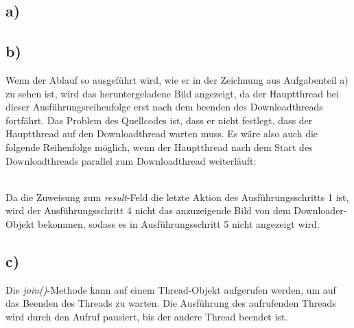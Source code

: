 \documentclass[ngerman]{fbi-aufgabenblatt}
\begin{document}
\subsection*{a)}
\subsection*{b)}
Wenn der Ablauf so ausgeführt wird, wie er in der Zeichnung aus Aufgabenteil a) zu sehen ist, wird das heruntergeladene Bild angezeigt, da der Hauptthread bei dieser Ausführungsreihenfolge erst nach dem beenden des Downloadthreads fortfährt. Das Problem des Quellcodes ist, dass er nicht festlegt, dass der Hauptthread auf den Downloadthread warten muss. Es wäre also auch die folgende Reihenfolge möglich, wenn der Hauptthread nach dem Start des Downloadthreads parallel zum Downloadthread weiterläuft: \\

 \\
Da die Zuweisung zum \textit{result}-Feld die letzte Aktion des Ausführungsschritts 1 ist, wird der Ausführungsschritt 4 nicht das anzuzeigende Bild von dem Downloader-Objekt bekommen, sodass es in Ausführungsschritt 5 nicht angezeigt wird.
\subsection*{c)}
Die \textit{join()}-Methode kann auf einem Thread-Objekt aufgerufen werden, um auf das Beenden des Threads zu warten. Die Ausführung des aufrufenden Threads wird durch den Aufruf pausiert, bis der andere Thread beendet ist.
\end{document}
